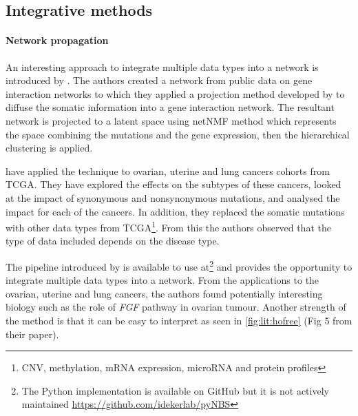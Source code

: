 \subsection{Integrative methods} \label{s:lit:net_data_int}

\vspace{3mm}
\vspace{3mm}


\paragraph*{Network propagation} \label{s:lit:net_prop}

An interesting approach to integrate multiple data types into a network is introduced by  \citet{Hofree2013-ld}. The authors created a network from public data on gene interaction networks \citep{Szklarczyk2019-pu, Cerami2011-ql, Lee2011-xj} to which they applied a projection method developed by \citet{Vanunu2010-el} to diffuse the somatic information into a gene interaction network. The resultant network is projected to a latent space using netNMF method \citep{Cai2008-fv} which represents the space combining the mutations and the gene expression, then the hierarchical clustering is applied.

\citet{Hofree2013-ld} have applied the technique to ovarian, uterine and lung cancers cohorts from TCGA. They have explored the effects on the subtypes of these cancers, looked at the impact of synonymous and nonsynonymous mutations, and analysed the impact for each of the cancers. In addition, they replaced the somatic mutations with other data types from TCGA\footnote{CNV, methylation, mRNA expression, microRNA and protein profiles}. From this the authors observed that the type of data included depends on the disease type.

The pipeline introduced by \citet{Hofree2013-ld} is available to use at\footnote{The Python implementation is available on GitHub but it is not actively maintained \url{https://github.com/idekerlab/pyNBS}} and provides the opportunity to integrate multiple data types into a network. From the applications to the ovarian, uterine and lung cancers, the authors found potentially interesting biology such as the role of \textit{FGF} pathway in ovarian tumour. Another strength of the method is that it can be easy to interpret as seen in \cref{fig:lit:hofree} (Fig 5 from their paper).

